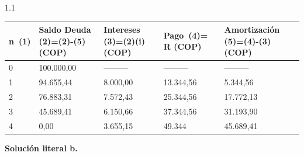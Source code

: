 	\begin{center}
	\begin{spacing}{1.1}
		\begin{tabular}{|p{1cm}|p{2cm}|p{2cm}|p{2cm}|p{3cm}|}
			\hline
			\rowcolor[HTML]{FFB183}
			\textbf{n\ (1)} & \textbf{Saldo Deuda (2)=(2)-(5) (COP)} & \textbf{Intereses  (3)=(2)(i) (COP)} & \textbf{Pago\ (4)=  R (COP)} & \textbf{Amortización  (5)=(4)-(3)(COP)} \\ \hline
			
			0               &   100{.}000,00                     & ---------                      & ---------               & ---------                          \\ \hline
			1               &   94{.}655,44                      &   8{.}000,00                     &   13{.}344,56             &   5{.}344,56                         \\ \hline
			2               &   76{.}883,31                      &   7{.}572,43                     &   25{.}344,56             &   17{.}772,13                        \\ \hline
			3               &   45{.}689,41                      &   6{.}150,66                     &   37{.}344,56             &   31{.}193,90                        \\ \hline
			4               &   0,00                           &  3{.}655,15                     &   49{.}344            &   45{.}689,41                        \\ \hline
		\end{tabular}
	\end{spacing}
	\end{center}

\begin{flushleft}
	\textbf{Solución literal b.}\\
\end{flushleft}

